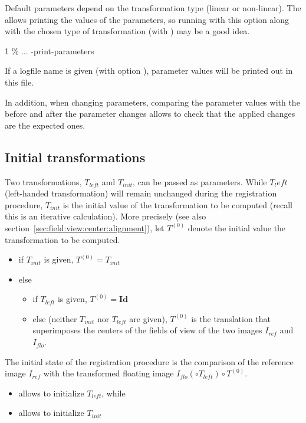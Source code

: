 \begin{attention} 
Default parameters depend on the transformation type (linear or non-linear). 
The  allows printing the values of the parameters, so running \blockmatching with this option along with the chosen type of transformation (with ) may be a good idea. 
\begin{code}{1}
\% \blockmatching ... -print-parameters
\end{code}
If a logfile name is given (with option ), parameter values will be printed out in this file.

In addition, when changing parameters, comparing the parameter values with the  before and after the parameter changes allows to check that the applied changes are the expected ones.
\end{attention}










\subsection{Initial transformations}
Two transformations, $T_{left}$ and $T_{init}$, can be passed
as parameters. While $T_left$ (left-handed transformation) will remain unchanged during the
registration procedure, $T_{init}$ is the initial value of the
transformation to be computed (recall this is an iterative
calculation). More precisely (see also section~\ref{sec:field:view:center:alignment}), let $T^{(0)}$ denote the initial value
the transformation to be computed.

\begin{itemize}
\item if $T_{init}$ is given, $T^{(0)} = T_{init}$ 
\item else 
\begin{itemize}
\item if $T_{left}$ is given, $T^{(0)}  = \mathbf{Id}$
\item else (neither $T_{init}$ nor $T_{left}$ are given), $T^{(0)}$ is the translation that superimposes the
centers of the fields of view of the two images $I_{ref}$ and
$I_{flo}$.
\end{itemize}
\end{itemize}

The initial state of the registration procedure is the
comparison of the reference image $I_{ref}$ with the transformed
floating  image $I_{flo} \left( \circ T_{left} \right) \circ T^{(0)}$.
\begin{itemize}
\item[]  allows to initialize $T_{left}$, while
\item[]  allows to initialize $T_{init}$
\end{itemize}

